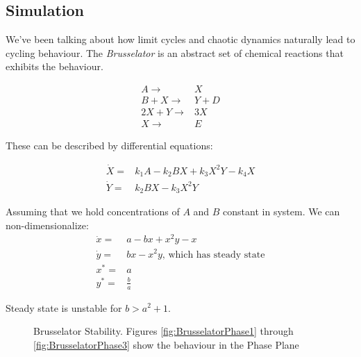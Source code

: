 \documentclass[]{article}
\begin{document}
{\subsection{Simulation}

We've been talking about how limit cycles and chaotic dynamics naturally lead to cycling behaviour. The \textit{Brusselator} is an abstract set of chemical reactions that exhibits the behaviour.

\begin{align*}
	A \rightarrow& X\\
	B + X \rightarrow& Y + D\\
	2X + Y \rightarrow& 3X \\
	X \rightarrow& E
\end{align*}

These can be described by differential equations:

\begin{align*}
\dot X =& k_1 A - k_2 B X + k_3 X^2 Y -k_4 X\\
\dot Y =& k_2 B X -k_3 X^2 Y  
\end{align*}

Assuming that we hold concentrations of $A$ and $B$ constant in system. We can non-dimensionalize:
\begin{align*}
\dot x =& a - b x +x^2 y -x\\
\dot y =& bx - x^2 y\text{, which has steady state}\\
x^* =& a\\
y^* =& \frac{b}{a}
\end{align*}

Steady state is unstable for $b>a^2+1$. 

\begin{figure}[H]
	\caption[Brusselator Stability and Phase Plane]{Brusselator Stability. Figures \ref{fig:BrusselatorPhase1} through \ref{fig:BrusselatorPhase3} show the behaviour in the Phase Plane}\label{fig:BrusselatorStability}
	

\end{figure}}
\end{document}
